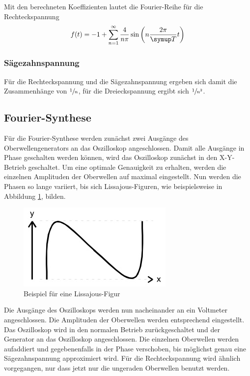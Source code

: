 Mit den berechneten Koeffizienten lautet die Fourier-Reihe für die Rechteckspannung
\begin{equation}
  f(t) = -1 + \sum_{n=1}^\infty{\frac{4}{n\pi}\sin{\left(n\frac{2\pi}{\su{T}}t\right)}}
\end{equation}
\subsubsection{Sägezahnspannung}

\par
\noindent Für die Rechteckspannung und die Sägezahnspannung ergeben sich damit die Zusammenhänge
von $\sfrac{1}{n}$, für die Dreieckspannung ergibt sich $\sfrac{1}{n^2}$.
\subsection{Fourier-Synthese}
Für die Fourier-Synthese werden zunächst zwei Ausgänge des Oberwellengenerators
an das Oszilloskop angeschlossen. Damit alle Ausgänge in Phase geschalten werden
können, wird das Oszilloskop zunächst in den X-Y-Betrieb geschaltet. Um eine
optimale Genauigkeit zu erhalten, werden die einzelnen Amplituden der Oberwellen
auf maximal eingestellt. Nun werden die Phasen so lange variiert, bis sich
Lissajous-Figuren, wie beispielsweise in Abbildung \ref{lissa}, bilden.
\begin{figure}[H]
  \centering
  \includegraphics{bilder/lissajous.jpg}
  \caption{Beispiel für eine Lissajous-Figur}
  \label{lissa}
\end{figure}
Die Ausgänge des Oszilloskops werden nun nacheinander an ein Voltmeter
angeschlossen. Die Amplituden der Oberwellen werden entsprechend eingestellt.
Das Oszilloskop wird in den normalen Betrieb zurückgeschaltet und der Generator
an das Oszilloskop angeschlossen. Die einzelnen Oberwellen werden aufaddiert und
gegebenenfalls in der Phase verschoben, bis möglichst genau eine Sägezahnspannung
approximiert wird.
Für die Rechteckspannung wird ähnlich vorgegangen, nur dass jetzt nur die
ungeraden Oberwellen benutzt werden.

